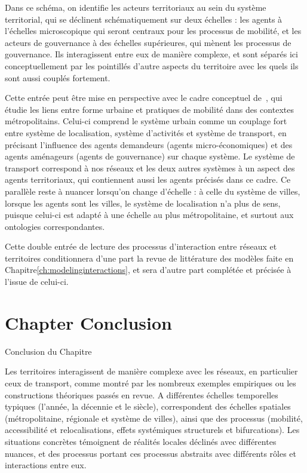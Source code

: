 Dans ce schéma, on identifie les acteurs territoriaux au sein du système territorial, qui se déclinent schématiquement sur deux échelles : les agents à l'échelles microscopique qui seront centraux pour les processus de mobilité, et les acteurs de gouvernance à des échelles supérieures, qui mènent les processus de gouvernance. Ils interagissent entre eux de manière complexe, et sont séparés ici conceptuellement par les pointillés d'autre aspects du territoire avec les quels ils sont aussi couplés fortement.


Cette entrée peut être mise en perspective avec le cadre conceptuel de~\cite{le2010approche}, qui étudie les liens entre forme urbaine et pratiques de mobilité dans des contextes métropolitains. Celui-ci comprend le système urbain comme un couplage fort entre système de localisation, système d'activités et système de transport, en précisant l'influence des agents demandeurs (agents micro-économiques) et des agents aménageurs (agents de gouvernance) sur chaque système. Le système de transport correspond à nos réseaux et les deux autres systèmes à un aspect des agents territoriaux, qui contiennent aussi les agents précisés dans ce cadre. Ce parallèle reste à nuancer lorsqu'on change d'échelle : à celle du système de villes, lorsque les agents sont les villes, le système de localisation n'a plus de sens, puisque celui-ci est adapté à une échelle au plus métropolitaine, et surtout aux ontologies correspondantes.


\bigskip

Cette double entrée de lecture des processus d'interaction entre réseaux et territoires conditionnera d'une part la revue de littérature des modèles faite en Chapitre\ref{ch:modelinginteractions}, et sera d'autre part complétée et précisée à l'issue de celui-ci.



\stars




\newpage


\section*{Chapter Conclusion}{Conclusion du Chapitre}




Les territoires interagissent de manière complexe avec les réseaux, en particulier ceux de transport, comme montré par les nombreux exemples empiriques ou les constructions théoriques passés en revue. A différentes échelles temporelles typiques (l'année, la décennie et le siècle), correspondent des échelles spatiales (métropolitaine, régionale et système de villes), ainsi que des processus (mobilité, accessibilité et relocalisations, effets systémiques structurels et bifurcations). Les situations concrètes témoignent de réalités locales déclinés avec différentes nuances, et des processus portant ces processus abstraits avec différents rôles et interactions entre eux.

